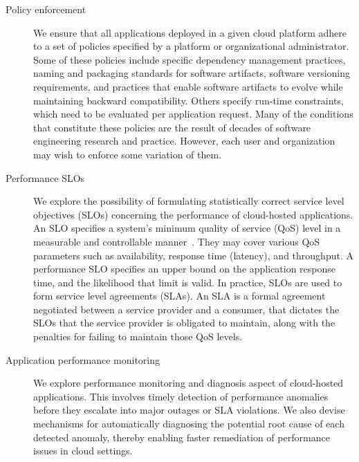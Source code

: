 \begin{description}
\item [Policy enforcement]
We ensure that all applications deployed in a given cloud platform 
adhere to a set of policies specified by a platform or organizational administrator.
Some of these policies include specific
dependency management practices, naming and packaging standards for software artifacts, 
software versioning requirements, and practices that enable software artifacts to evolve 
while maintaining backward compatibility.
Others specify run-time constraints, which need to be evaluated per application request.
Many of the conditions that constitute these policies are the result of decades of software 
engineering research and practice. 
However, each user and organization may wish to enforce some variation of them.

\item [Performance SLOs]
We explore the possibility of formulating statistically correct service level objectives (SLOs)
concerning the performance of cloud-hosted applications.
An SLO specifies a system's minimum quality of service (QoS) level in a measurable and
controllable manner~\cite{smj2000}. They may cover various QoS
parameters such as availability, response time (latency), and throughput. A performance SLO
specifies an upper bound on the application response time, and the likelihood that limit is valid.
In practice, SLOs are used to form service level agreements (SLAs). An SLA is
a formal agreement negotiated between a service provider and a consumer, that dictates the SLOs 
that the service provider is obligated to maintain, along with the 
penalties for failing to maintain those QoS levels.

\item [Application performance monitoring]
We explore performance monitoring and diagnosis aspect of cloud-hosted applications.
This involves timely detection of performance anomalies before they escalate into major outages or
SLA violations. We also devise mechanisms for automatically diagnosing the potential root cause
of each detected anomaly, thereby enabling faster remediation of performance issues in
cloud settings.
\end{description}

